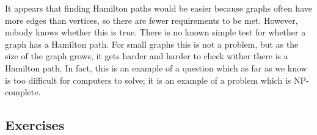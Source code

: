 \documentclass[12pt,]{book}
\theoremstyle{plain}
\theoremstyle{definition}
\theoremstyle{definition}
\theoremstyle{definition}
\numberwithin{equation}{chapter}
\begin{document}
\hypertarget{p-1696}{}%
It appears that finding Hamilton paths would be easier because graphs often have more edges than vertices, so there are fewer requirements to be met. However, nobody knows whether this is true. There is no known simple test for whether a graph has a Hamilton path. For small graphs this is not a problem, but as the size of the graph grows, it gets harder and harder to check wither there is a Hamilton path. In fact, this is an example of a question which as far as we know is too difficult for computers to solve; it is an example of a problem which is NP-complete.%
\typeout{************************************************}
\typeout{************************************************}
\subsection*{Exercises}\label{exercises_gt-paths}
\end{document}
